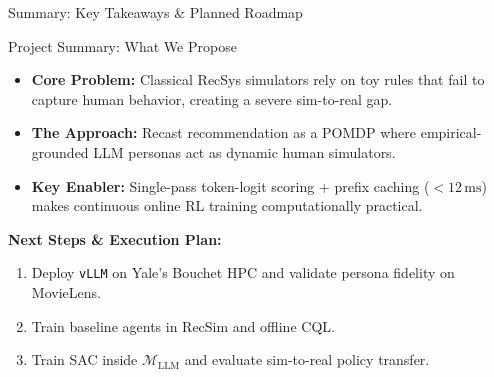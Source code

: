 \documentclass[handout]{beamer}
\begin{document}
\begin{frame}{Summary: Key Takeaways \& Planned Roadmap}
  \begin{block}{Project Summary: What We Propose}
    \small
    \begin{itemize}
      \item \textbf{Core Problem:} Classical RecSys simulators rely on toy rules that fail to capture human behavior, creating a severe sim-to-real gap.
      \item \textbf{The Approach:} Recast recommendation as a POMDP where empirical-grounded LLM personas act as dynamic human simulators.
      \item \textbf{Key Enabler:} Single-pass token-logit scoring + prefix caching ($<12\,\text{ms}$) makes continuous online RL training computationally practical.
    \end{itemize}
  \end{block}

  \pause
  \vspace{0.08cm}

  {\textbf{\textcolor{PomonaNavy}{Next Steps \& Execution Plan:}}}
  \small
  \begin{enumerate}
    \item Deploy \texttt{vLLM} on Yale's Bouchet HPC and validate persona fidelity on MovieLens.
    \item Train baseline agents in RecSim and offline CQL.
    \item Train SAC inside $\mathcal{M}_{\text{LLM}}$ and evaluate sim-to-real policy transfer.
  \end{enumerate}
\end{frame}
\end{document}

